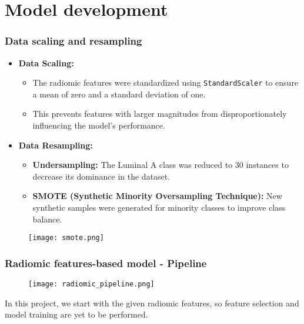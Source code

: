 \section{Model development}


\begin{frame}
    \frametitle{Data scaling and resampling}
    \vspace{3mm}

	\begin{itemize}
	        \item \textbf{Data Scaling:}
	        \begin{itemize}
	            \item The radiomic features were standardized using \texttt{StandardScaler} to ensure a mean of zero and a standard deviation of one.
	            \item This prevents features with larger magnitudes from disproportionately influencing the model’s performance.
	        \end{itemize}
	
	        \vspace{3mm}
	        \item \textbf{Data Resampling:}
	        \begin{itemize}
	            \item \textbf{Undersampling:} The Luminal A class was reduced to 30 instances to decrease its dominance in the dataset.
	            \item \textbf{SMOTE (Synthetic Minority Oversampling Technique):} New synthetic samples were generated for minority classes to improve class balance.
	        \end{itemize}
	    \end{itemize}

	   \begin{figure}[h]
	        \centering
	        \texttt{[image: smote.png]}
	    \end{figure}

    \vfill 
\end{frame}


\begin{frame}
    \frametitle{Radiomic features-based model - Pipeline}
    \vspace{3mm}

	   \begin{figure}[h]
	        \centering
	        \texttt{[image: radiomic\_pipeline.png]}
	    \end{figure}

	\vspace{2mm}
    	\begin{center}
    	In this project, we start with the given radiomic features, so feature selection and model training are yet to be performed.
	\end{center}

    \vfill 
\end{frame}

